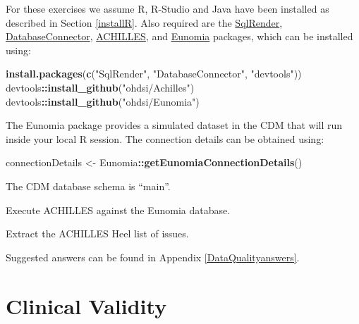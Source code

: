\documentclass[11pt]{book}
\newenvironment{Shaded}{\begin{snugshade}}{\end{snugshade}}
\newcommand{\KeywordTok}[1]{\textcolor[rgb]{0.13,0.29,0.53}{\textbf{#1}}}
\newcommand{\NormalTok}[1]{#1}
\newcommand{\OperatorTok}[1]{\textcolor[rgb]{0.81,0.36,0.00}{\textbf{#1}}}
\newcommand{\StringTok}[1]{\textcolor[rgb]{0.31,0.60,0.02}{#1}}
\theoremstyle{definition}
\theoremstyle{definition}
\theoremstyle{definition}
\theoremstyle{remark}
\let\BeginKnitrBlock\begin \let\EndKnitrBlock\end
\begin{document}
For these exercises we assume R, R-Studio and Java have been installed as described in Section \ref{installR}. Also required are the \href{https://ohdsi.github.io/SqlRender/}{SqlRender}, \href{https://ohdsi.github.io/DatabaseConnector/}{DatabaseConnector}, \href{https://github.com/OHDSI/Achilles}{ACHILLES}, and \href{https://ohdsi.github.io/Eunomia/}{Eunomia} packages, which can be installed using:

\begin{Shaded}
\begin{Highlighting}[]
\KeywordTok{install.packages}\NormalTok{(}\KeywordTok{c}\NormalTok{(}\StringTok{"SqlRender"}\NormalTok{, }\StringTok{"DatabaseConnector"}\NormalTok{, }\StringTok{"devtools"}\NormalTok{))}
\NormalTok{devtools}\OperatorTok{::}\KeywordTok{install_github}\NormalTok{(}\StringTok{"ohdsi/Achilles"}\NormalTok{)}
\NormalTok{devtools}\OperatorTok{::}\KeywordTok{install_github}\NormalTok{(}\StringTok{"ohdsi/Eunomia"}\NormalTok{)}
\end{Highlighting}
\end{Shaded}

The Eunomia package provides a simulated dataset in the CDM that will run inside your local R session. The connection details can be obtained using:

\begin{Shaded}
\begin{Highlighting}[]
\NormalTok{connectionDetails <-}\StringTok{ }\NormalTok{Eunomia}\OperatorTok{::}\KeywordTok{getEunomiaConnectionDetails}\NormalTok{()}
\end{Highlighting}
\end{Shaded}

The CDM database schema is ``main''.

\BeginKnitrBlock{exercise}
\protect\hypertarget{exr:exerciseRunAchilles}{}{\label{exr:exerciseRunAchilles} }Execute ACHILLES against the Eunomia database.
\EndKnitrBlock{exercise}

\BeginKnitrBlock{exercise}
\protect\hypertarget{exr:exerciseViewHeel}{}{\label{exr:exerciseViewHeel} }Extract the ACHILLES Heel list of issues.
\EndKnitrBlock{exercise}

Suggested answers can be found in Appendix \ref{DataQualityanswers}.

\hypertarget{ClinicalValidity}{%
\chapter{Clinical Validity}\label{ClinicalValidity}}
\end{document}
